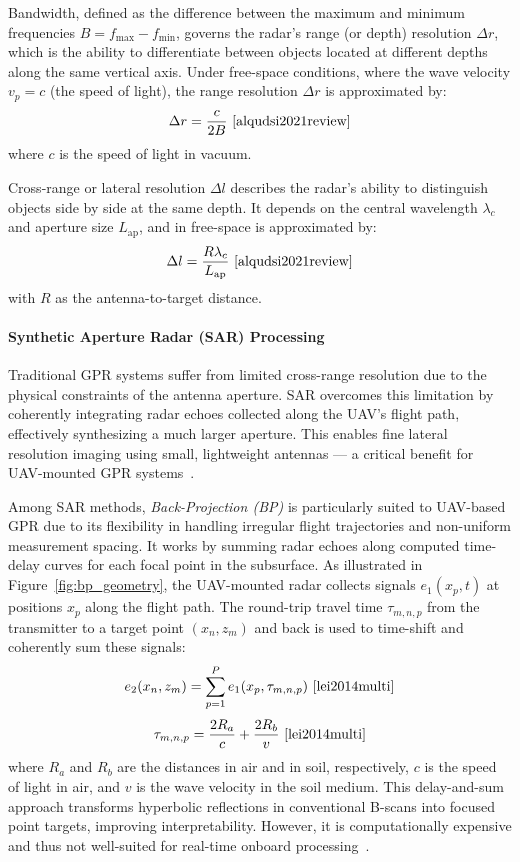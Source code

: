 Bandwidth, defined as the difference between the maximum and minimum frequencies $B = f_{\text{max}} - f_{\text{min}}$, governs the radar’s range (or depth) resolution $\Delta r$, which is the ability to differentiate between objects located at different depths along the same vertical axis. Under free-space conditions, where the wave velocity $v_p = c$ (the speed of light), the range resolution $\Delta r$ is approximated by:
\[
\Delta r = \frac{c}{2B}~\cite{alqudsi2021review}
\]
where $c$ is the speed of light in vacuum.



Cross-range or lateral resolution $\Delta l$ describes the radar’s ability to distinguish objects side by side at the same depth. It depends on the central wavelength $\lambda_c$ and aperture size $L_{\text{ap}}$, and in free-space is approximated by:
\[
\Delta l = \frac{R \lambda_c}{L_{\text{ap}}}~\cite{alqudsi2021review}
\]
with $R$ as the antenna-to-target distance.


\paragraph{Synthetic Aperture Radar (SAR) Processing}

Traditional GPR systems suffer from limited cross-range resolution due to the physical constraints of the antenna aperture. SAR overcomes this limitation by coherently integrating radar echoes collected along the UAV’s flight path, effectively synthesizing a much larger aperture. This enables fine lateral resolution imaging using small, lightweight antennas — a critical benefit for UAV-mounted GPR systems~\cite{alqudsi2021review}.

Among SAR methods, \textit{Back-Projection (BP)} is particularly suited to UAV-based GPR due to its flexibility in handling irregular flight trajectories and non-uniform measurement spacing. It works by summing radar echoes along computed time-delay curves for each focal point in the subsurface. As illustrated in Figure~\ref{fig:bp_geometry}, the UAV-mounted radar collects signals $e_1(x_p, t)$ at positions $x_p$ along the flight path. The round-trip travel time $\tau_{m,n,p}$ from the transmitter to a target point $(x_n, z_m)$ and back is used to time-shift and coherently sum these signals:
\[
e_2(x_n, z_m) = \sum_{p=1}^{P} e_1(x_p, \tau_{m,n,p})~\cite{lei2014multi}
\]
\[
\tau_{m,n,p} = \frac{2R_a}{c} + \frac{2R_b}{v}~\cite{lei2014multi}
\]
where $R_a$ and $R_b$ are the distances in air and in soil, respectively, $c$ is the speed of light in air, and $v$ is the wave velocity in the soil medium. This delay-and-sum approach transforms hyperbolic reflections in conventional B-scans into focused point targets, improving interpretability. However, it is computationally expensive and thus not well-suited for real-time onboard processing~\cite{lei2014multi}.

